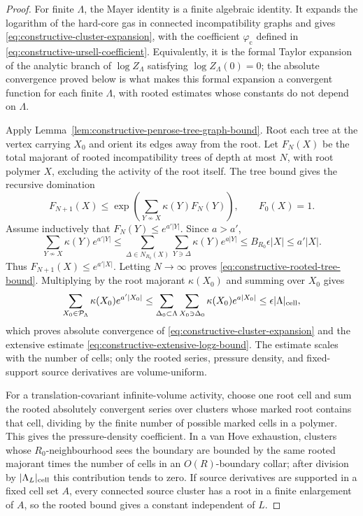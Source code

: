 \begin{proof}
For finite \(\Lambda\), the Mayer identity is a finite algebraic identity.
It expands the logarithm of the hard-core gas in connected incompatibility
graphs and gives \eqref{eq:constructive-cluster-expansion}, with the
coefficient \(\varphi_{\mathrm c}\) defined in
\eqref{eq:constructive-ursell-coefficient}.  Equivalently, it is the formal
Taylor expansion of the analytic branch of \(\log Z_\Lambda\) satisfying
\(\log Z_\Lambda(0)=0\); the absolute convergence proved below is what makes
this formal expansion a convergent function for each finite \(\Lambda\), with
rooted estimates whose constants do not depend on \(\Lambda\).

Apply Lemma~\ref{lem:constructive-penrose-tree-graph-bound}.  Root each tree
at the vertex carrying \(X_0\) and orient its edges away from the root.  Let
\(F_N(X)\) be the total majorant of rooted incompatibility trees of depth at
most \(N\), with root polymer \(X\), excluding the activity of the root
itself.  The tree bound gives the recursive domination
\begin{equation}
  F_{N+1}(X)
  \leq
  \exp\!\left(
    \sum_{Y\nsim X}\kappa(Y)F_N(Y)
  \right),
  \qquad F_0(X)=1 .
  \label{eq:constructive-rooted-tree-recursion}
\end{equation}
Assume inductively that \(F_N(Y)\leq e^{a'|Y|}\).  Since \(a>a'\),
\begin{equation}
  \sum_{Y\nsim X}\kappa(Y)e^{a'|Y|}
  \leq
  \sum_{\Delta\in N_{R_0}(X)}
  \sum_{Y\ni\Delta}\kappa(Y)e^{a|Y|}
  \leq
  B_{R_0}\epsilon |X|
  \leq
  a'|X|.
  \label{eq:constructive-kp-recursive-bound}
\end{equation}
Thus \(F_{N+1}(X)\leq e^{a'|X|}\).  Letting \(N\to\infty\) proves
\eqref{eq:constructive-rooted-tree-bound}.  Multiplying by the root
majorant \(\kappa(X_0)\) and summing over \(X_0\) gives
\[
  \sum_{X_0\in\mathcal P_\Lambda}\kappa(X_0)e^{a'|X_0|}
  \leq
  \sum_{\Delta_0\subset\Lambda}
  \sum_{X_0\ni\Delta_0}\kappa(X_0)e^{a|X_0|}
  \leq
  \epsilon|\Lambda|_{\rm cell},
\]
which proves absolute convergence of
\eqref{eq:constructive-cluster-expansion} and the extensive estimate
\eqref{eq:constructive-extensive-logz-bound}.  The estimate scales with the
number of cells; only the rooted series, pressure density, and fixed-support
source derivatives are volume-uniform.

For a translation-covariant infinite-volume activity, choose one root cell and
sum the rooted absolutely convergent series over clusters whose marked root
contains that cell, dividing by the finite number of possible marked cells in a
polymer.  This gives the pressure-density coefficient.  In a van Hove
exhaustion, clusters whose \(R_0\)-neighbourhood sees the boundary are bounded
by the same rooted majorant times the number of cells in an \(O(R)\)-boundary
collar; after division by \(|\Lambda_L|_{\rm cell}\) this contribution tends
to zero.  If source derivatives are supported in a fixed cell set \(A\), every
connected source cluster has a root in a finite enlargement of \(A\), so the
rooted bound gives a constant independent of \(L\).


\end{proof}
